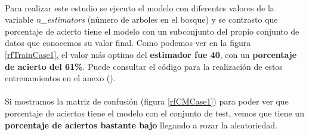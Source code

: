 \paragraph{}
Para realizar este estudio se ejecuto el modelo con diferentes valores de la variable \textit{n\_estimators}\cite{ref:rf_random_forest_classifier} (número de arboles en el bosque) y se contrasto que porcentaje de acierto tiene el modelo con un subconjunto del propio conjunto de datos que conocemos su valor final. Como podemos ver en la figura \ref{rfTrainCase1}, el valor más optimo del \textbf{estimador fue 40}, con un \textbf{porcentaje de acierto del 61\%}. Puede consultar el código para la realización de estos entrenamientos en el anexo ().

\paragraph{}
Si mostramos la matriz de confusión\cite{ref:confusion_matrix} (figura \ref{rfCMCase1}) para poder ver que porcentaje de aciertos tiene el modelo con el conjunto de test, vemos que tiene un \textbf{porcentaje de aciertos bastante bajo} llegando a rozar la aleatoriedad.

